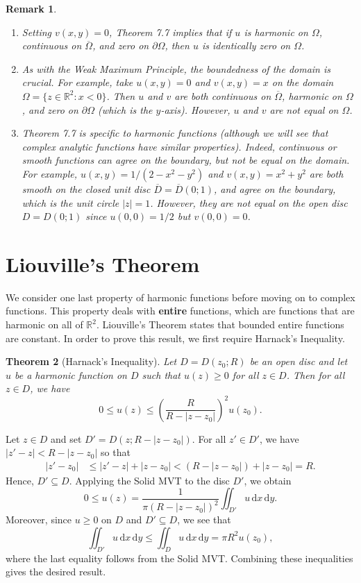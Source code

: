 \documentclass[10pt]{article}
\makeatletter
\newcommand{\R}{\mathbb{R}}
\newcommand{\dd}{\,\mathrm{d}}
\theoremstyle{newstyle}
\newtheorem{thm}{Theorem}[section]
\newtheorem{remark}[thm]{Remark}
\newenvironment{pf}[1][\proofname]{\par
  \pushQED{\qed}%
  \normalfont \topsep0\p@\relax
  \trivlist
  \item[\hskip\labelsep\scshape
  #1\@addpunct{.}]\ignorespaces
}{%
  \popQED\endtrivlist\@endpefalse
}
\makeatother
\begin{document}
\begin{remark}~
\begin{enumerate}[(1)]
    \item Setting $v(x, y) = 0$, Theorem 7.7 implies that if $u$ is harmonic on $\Omega$, 
    continuous on $\overline\Omega$, and zero on $\partial\Omega$, then $u$ is identically 
    zero on $\Omega$. 
    \item As with the Weak Maximum Principle, the boundedness of the domain is crucial. 
    For example, take $u(x, y) = 0$ and $v(x, y) = x$ on the domain $\Omega = \{z \in \R^2 : x < 0\}$. 
    Then $u$ and $v$ are both continuous on $\overline\Omega$, harmonic on $\Omega$, 
    and zero on $\partial\Omega$ (which is the $y$-axis). However, $u$ and $v$ are not 
    equal on $\Omega$.
    \item Theorem 7.7 is specific to harmonic functions (although we will see that complex 
    analytic functions have similar properties). Indeed, continuous or smooth 
    functions can agree on the boundary, but not be equal on the domain. 
    For example, $u(x, y) = 1/(2-x^2-y^2)$ and $v(x, y) = x^2 + y^2$ are both 
    smooth on the closed unit disc $\overline{D} = \overline{D}(0; 1)$, 
    and agree on the boundary, which is the unit circle $|z| = 1$. 
    However, they are not equal on the open disc $D = D(0; 1)$ since 
    $u(0, 0) = 1/2$ but $v(0, 0) = 0$.
\end{enumerate}
\end{remark}

\newpage 
\section{Liouville's Theorem}

We consider one last property of harmonic functions before moving on to complex functions. 
This property deals with {\bf entire} functions, which are functions that are 
harmonic on all of $\R^2$. Liouville's Theorem states that bounded entire functions 
are constant. In order to prove this result, we first require Harnack's Inequality.

\begin{thm}[Harnack's Inequality]
Let $D = D(z_0; R)$ be an open disc and let $u$ be a harmonic function on $D$ such that 
$u(z) \geq 0$ for all $z \in D$. Then for all $z \in D$, we have 
\[ 0 \leq u(z) \leq \left( \frac{R}{R-|z-z_0|} \right)^2 u(z_0). \]
\end{thm}
\begin{pf}
Let $z \in D$ and set $D' = D(z; R - |z-z_0|)$. For all $z' \in D'$, we have 
$|z' - z| < R - |z-z_0|$ so that 
\begin{align*}
    |z' - z_0| &\leq |z' - z| + |z - z_0| < (R - |z-z_0|) + |z-z_0| = R. 
\end{align*}
Hence, $D' \subseteq D$. Applying the Solid MVT to the disc $D'$, we obtain 
\[ 0 \leq u(z) = \frac{1}{\pi (R - |z-z_0|)^2} \iint_{D'} u\dd x \dd y. \]
Moreover, since $u \geq 0$ on $D$ and $D' \subseteq D$, we see that 
\[ \iint_{D'} u\dd x \dd y \leq \iint_D u \dd x \dd y = \pi R^2 u(z_0), \]
where the last equality follows from the Solid MVT. Combining these 
inequalities gives the desired result.
\end{pf}
\end{document}
